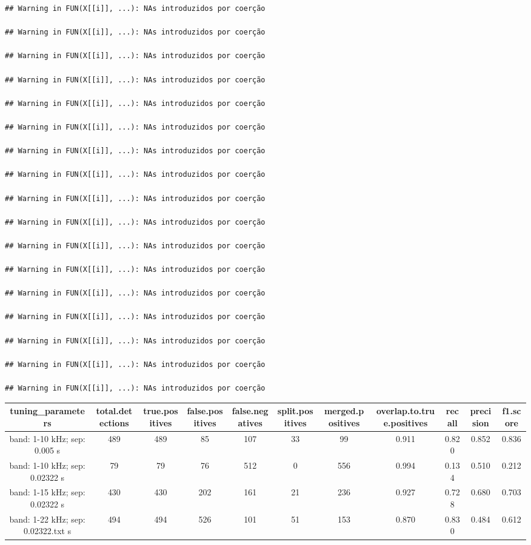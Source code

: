 \documentclass[
]{article}
\begin{document}
\begin{verbatim}
## Warning in FUN(X[[i]], ...): NAs introduzidos por coerção

## Warning in FUN(X[[i]], ...): NAs introduzidos por coerção

## Warning in FUN(X[[i]], ...): NAs introduzidos por coerção

## Warning in FUN(X[[i]], ...): NAs introduzidos por coerção

## Warning in FUN(X[[i]], ...): NAs introduzidos por coerção

## Warning in FUN(X[[i]], ...): NAs introduzidos por coerção

## Warning in FUN(X[[i]], ...): NAs introduzidos por coerção

## Warning in FUN(X[[i]], ...): NAs introduzidos por coerção

## Warning in FUN(X[[i]], ...): NAs introduzidos por coerção

## Warning in FUN(X[[i]], ...): NAs introduzidos por coerção

## Warning in FUN(X[[i]], ...): NAs introduzidos por coerção

## Warning in FUN(X[[i]], ...): NAs introduzidos por coerção

## Warning in FUN(X[[i]], ...): NAs introduzidos por coerção

## Warning in FUN(X[[i]], ...): NAs introduzidos por coerção

## Warning in FUN(X[[i]], ...): NAs introduzidos por coerção

## Warning in FUN(X[[i]], ...): NAs introduzidos por coerção

## Warning in FUN(X[[i]], ...): NAs introduzidos por coerção
\end{verbatim}

\begin{table}
\centering
\begin{tabular}[t]{c|c|c|c|c|c|c|c|c|c|c}
\hline
tuning\_parameters & total.detections & true.positives & false.positives & false.negatives & split.positives & merged.positives & overlap.to.true.positives & recall & precision & f1.score\\
\hline
band: 1-10 kHz; sep: 0.005 s & 489 & 489 & 85 & 107 & 33 & 99 & 0.911 & 0.820 & 0.852 & 0.836\\
\hline
band: 1-10 kHz; sep: 0.02322 s & 79 & 79 & 76 & 512 & 0 & 556 & 0.994 & 0.134 & 0.510 & 0.212\\
\hline
band: 1-15 kHz; sep: 0.02322 s & 430 & 430 & 202 & 161 & 21 & 236 & 0.927 & 0.728 & 0.680 & 0.703\\
\hline
band: 1-22 kHz; sep: 0.02322.txt s & 494 & 494 & 526 & 101 & 51 & 153 & 0.870 & 0.830 & 0.484 & 0.612\\
\hline
\end{tabular}
\end{table}
\end{document}
